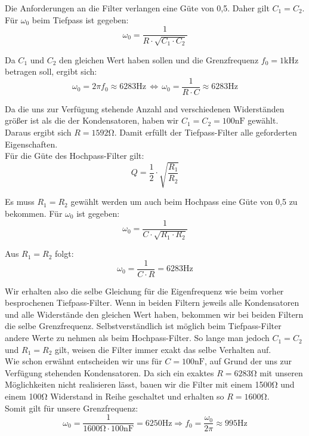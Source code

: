 Die Anforderungen an die Filter verlangen eine Güte von 0,5. Daher gilt $C_{1}=C_{2}$.\\
Für $\omega_{0}$ beim Tiefpass ist gegeben:
$$\omega_{0}=\frac{1}{R\cdot\sqrt{C_{1} \cdot C_{2}}}$$

Da $C_{1}$ und $C_{2}$ den gleichen Wert haben sollen und die Grenzfrequenz $f_{0}=1\si{\kilo\hertz}$ betragen soll, ergibt sich:
$$\omega_{0}=2\pi f_{0} \approx 6283\si{\hertz} \, \Leftrightarrow \,\omega_{0}=\frac{1}{R\cdot C}\approx 6283\si{\hertz} $$

Da die uns zur Verfügung stehende Anzahl and verschiedenen Widerständen größer ist als die der Kondensatoren, haben wir $C_{1}=C_{2}=100\si{\nano\farad}$ gewählt.
Daraus ergibt sich $R=1592\si{\ohm}$. Damit erfüllt der Tiefpass-Filter alle geforderten Eigenschaften. \\
Für die Güte des Hochpass-Filter gilt:
$$Q=\frac{1}{2}\cdot\sqrt{\frac{R_{1}}{R_{2}}}$$

Es muss $R_{1}=R_{2}$ gewählt werden um auch beim Hochpass eine Güte von 0,5 zu bekommen.
Für $\omega_{0}$ ist gegeben:
$$\omega_{0} = \frac{1}{C\cdot\sqrt{R_{1}\cdot R_{2}}}$$

Aus $R_{1}=R_{2}$ folgt:
$$\omega_{0} = \frac{1}{C\cdot R}=6283\si{\hertz}$$

Wir erhalten also die selbe Gleichung für die Eigenfrequenz wie beim vorher besprochenen Tiefpass-Filter. Wenn in beiden Filtern jeweils alle Kondensatoren und alle Widerstände den gleichen Wert haben, bekommen wir bei beiden Filtern die selbe Grenzfrequenz. Selbstverständlich ist möglich beim Tiefpass-Filter andere Werte zu nehmen als beim Hochpass-Filter. So lange man jedoch $C_{1}=C_{2}$ und $R_{1}=R_{2}$ gilt, weisen die Filter immer exakt das selbe Verhalten auf.\\
Wie schon erwähnt entscheiden wir uns für $C=100\si{\nano\farad}$, auf Grund der uns zur Verfügung stehenden Kondensatoren. Da sich ein exaktes $R=6283\si{\ohm}$ mit unseren Möglichkeiten nicht realisieren lässt, bauen wir die Filter mit einem 1500\si{\ohm} und einem 100\si{\ohm} Widerstand in Reihe geschaltet und erhalten so $R=1600\si{\ohm}$.\\
Somit gilt für unsere Grenzfrequenz:
$$\omega_{0}=\frac{1}{1600\si{\ohm}\cdot 100\si{\nano\farad}}=6250\si{\hertz}\Rightarrow f_{0}=\frac{\omega_{0}}{2\pi}\approx 995\si{\hertz}$$

